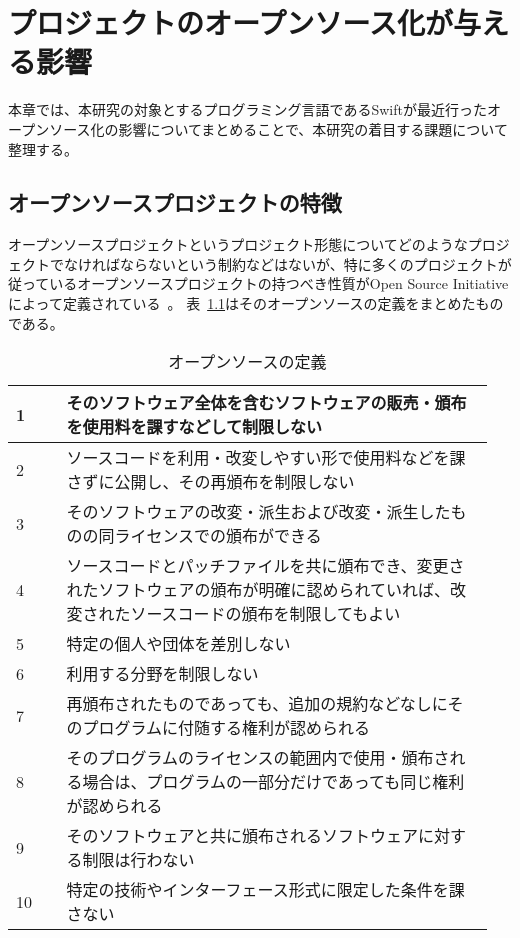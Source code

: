 \chapter{プロジェクトのオープンソース化が与える影響}
\label{open-source}

本章では、本研究の対象とするプログラミング言語であるSwiftが最近行ったオープンソース化の影響についてまとめることで、本研究の着目する課題について整理する。

\section{オープンソースプロジェクトの特徴}
\label{open-source:feature}

オープンソースプロジェクトというプロジェクト形態についてどのようなプロジェクトでなければならないという制約などはないが、特に多くのプロジェクトが従っているオープンソースプロジェクトの持つべき性質がOpen Source Initiativeによって定義されている~\cite{opensource}。
表~\ref{table:open-source-definition}はそのオープンソースの定義をまとめたものである。

\begin{table}[!hbtp]
    \begin{center}
        \caption{オープンソースの定義}
        \begin{tabular}{|p{0.1\linewidth}|p{0.85\linewidth}|}
            \hline
            1 & そのソフトウェア全体を含むソフトウェアの販売・頒布を使用料を課すなどして制限しない \\
            \hline
            2 & ソースコードを利用・改変しやすい形で使用料などを課さずに公開し、その再頒布を制限しない \\
            \hline
            3 & そのソフトウェアの改変・派生および改変・派生したものの同ライセンスでの頒布ができる \\
            \hline
            4 & ソースコードとパッチファイルを共に頒布でき、変更されたソフトウェアの頒布が明確に認められていれば、改変されたソースコードの頒布を制限してもよい \\
            \hline
            5 & 特定の個人や団体を差別しない \\
            \hline
            6 & 利用する分野を制限しない \\
            \hline
            7 & 再頒布されたものであっても、追加の規約などなしにそのプログラムに付随する権利が認められる \\
            \hline
            8 & そのプログラムのライセンスの範囲内で使用・頒布される場合は、プログラムの一部分だけであっても同じ権利が認められる \\
            \hline
            9 & そのソフトウェアと共に頒布されるソフトウェアに対する制限は行わない \\
            \hline
            10 & 特定の技術やインターフェース形式に限定した条件を課さない \\
            \hline
        \end{tabular}
        \label{table:open-source-definition}
    \end{center}
\end{table}

